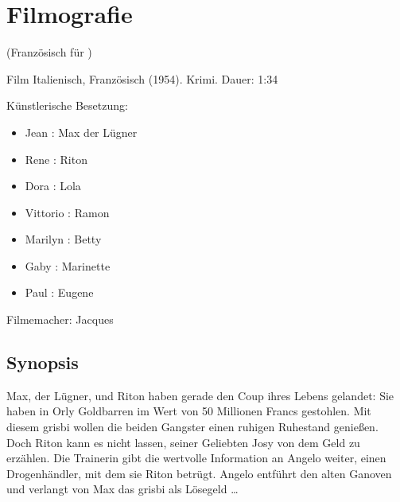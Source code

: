 \section{Filmografie\label{preamble-filmography}}

 (Französisch für )

Film Italienisch, Französisch (1954). Krimi. Dauer: 1:34

Künstlerische Besetzung:

\begin{itemize}\itemsep=-3pt
    \item Jean : Max der Lügner
    \item Rene : Riton
    \item Dora : Lola
    \item Vittorio : Ramon
    \item Marilyn : Betty
    \item Gaby : Marinette
    \item Paul : Eugene
\end{itemize}

Filmemacher: Jacques 

\subsection*{Synopsis}


Max, der Lügner, und Riton haben gerade den Coup ihres Lebens gelandet: Sie haben in Orly Goldbarren im Wert von 50 Millionen Francs gestohlen. Mit diesem \glqq{}grisbi\grqq{} wollen die beiden Gangster einen ruhigen Ruhestand genießen. Doch Riton kann es nicht lassen, seiner Geliebten Josy von dem Geld zu erzählen. Die Trainerin gibt die wertvolle Information an Angelo weiter, einen Drogenhändler, mit dem sie Riton betrügt. Angelo entführt den alten Ganoven und verlangt von Max das \glqq{}grisbi\grqq{} als Lösegeld \dots{}

